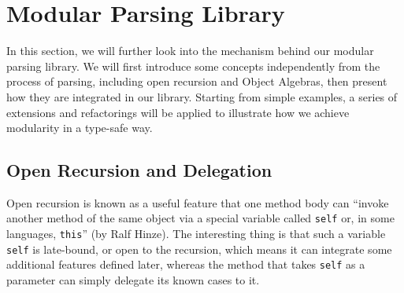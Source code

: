 \section{Modular Parsing Library}\label{sec:library}


In this section, we will further look into the mechanism behind our modular parsing library.
We will first introduce some concepts independently from the process of parsing, including open recursion and Object Algebras,
then present how they are integrated in our library.
Starting from simple examples, a series of extensions and refactorings will be applied to illustrate
how we achieve modularity in a type-safe way.

\subsection{Open Recursion and Delegation}\label{sec:openrecursion}

Open recursion is known as a useful feature that one method body can ``invoke another method of the same object via a special variable called \lstinline{self} or, in some languages, \lstinline[keywords={}]{this}'' (by Ralf Hinze). The interesting thing is that such a variable \lstinline{self} is late-bound, or open to the recursion, which means it can integrate some additional features defined later, whereas the method that takes \lstinline{self} as a parameter can simply delegate its known cases to it.

